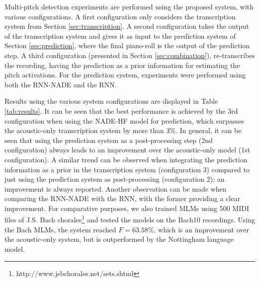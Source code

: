 \begin{table}[t]
 \begin{center}
\end{center}
\vspace{-0.1in}
 \caption{Validation results for MLMs}
 \label{tab:prediction}
 \vspace{-0.1in}
\end{table}


Multi-pitch detection experiments are performed using the proposed system, with various configurations. A first configuration only considers the transcription system from Section \ref{sec:transcription}. A second configuration takes the output of the transcription system and gives it as input to the prediction system of Section \ref{sec:prediction}, where the final piano-roll is the output of the prediction step. A third configuration (presented in Section \ref{sec:combination}), re-transcribes the recording, having the prediction as a prior information for estimating the pitch activations. For the prediction system, experiments were performed using both the RNN-NADE and the RNN.

Results using the various system configurations are displayed in Table \ref{tab:results}. It can be seen that the best performance is achieved by the 3rd configuration when using the NADE-HF model for prediction, which surpasses the acoustic-only transcription system by more than 3\%. In general, it can be seen that using the prediction system as a post-processing step (2nd configuration) always leads to an improvement over the acoustic-only model (1st configuration). A similar trend can be observed when integrating the prediction information as a prior in the transcription system (configuration 3) compared to just using the prediction system as post-processing (configuration 2); an improvement is always reported. Another observation can be made when comparing the RNN-NADE with the RNN, with the former providing a clear improvement. For comparative purposes, we also trained MLMs using 500 MIDI files of J.S. Bach chorales\footnote{http://www.jsbchorales.net/sets.shtml} and tested the models on the Bach10 
recordings. Using the Bach MLMs, the system reached $F =  63.58\%$, which is an improvement over the acoustic-only system, but is outperformed by the Nottingham language model. 

